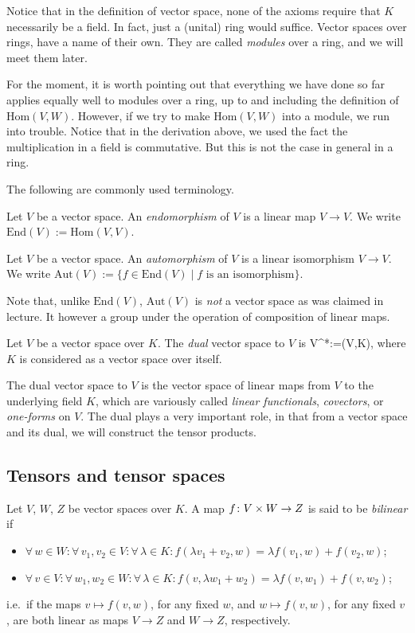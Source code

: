 \br
Notice that in the definition of vector space, none of the axioms require that $K$ necessarily be a field. In fact, just a (unital) ring would suffice. Vector spaces over rings, have a name of their own. They are called \emph{modules} over a ring, and we will meet them later.

For the moment, it is worth pointing out that everything we have done so far applies equally well to modules over a ring, up to and including the definition of $\mathrm{Hom}(V,W)$. However, if we try to make $\mathrm{Hom}(V,W)$ into a module, we run into trouble. Notice that in the derivation above, we used the fact the multiplication in a field is commutative. But this is not the case in general in a ring.
\er

The following are commonly used terminology.

\bd
Let $V$ be a vector space. An \emph{endomorphism} of $V$ is a linear map $V\to V$. We write $\mathrm{End}(V):=\mathrm{Hom}(V,V)$.
\ed

\bd
Let $V$ be a vector space. An \emph{automorphism} of $V$ is a linear isomorphism $V\to V$. We write $\mathrm{Aut}(V):=\{f \in \mathrm{End}(V) \mid f \text{ is an isomorphism}\}$.
\ed

\br
Note that, unlike $\mathrm{End}(V)$, $\mathrm{Aut}(V)$ is \emph{not} a vector space as was claimed in lecture. It however a group under the operation of composition of linear maps.
\er

\bd
Let $V$ be a vector space over $K$. The \emph{dual} vector space to $V$ is
\bse
V^*:=\Hom(V,K),
\ese
where $K$ is considered as a vector space over itself.
\ed

The dual vector space to $V$ is the vector space of linear maps from $V$ to the underlying field $K$, which are variously called \emph{linear functionals}, \emph{covectors}, or \emph{one-forms} on $V$. The dual plays a very important role, in that from a vector space and its dual, we will construct the tensor products.

\subsection{Tensors and tensor spaces}

\bd
Let $V$, $W$, $Z$ be vector spaces over $K$. A map $f\colon V\times W \to Z$ is said to be \emph{bilinear} if
\begin{itemize}
\item $\forall \, w\in W:\forall \, v_1,v_2\in V: \forall \,\lambda \in K : f(\lambda v_1+v_2,w)=\lambda f(v_1,w)+f(v_2,w)$;
\item $\forall \, v\in V:\forall \, w_1,w_2\in W: \forall \,\lambda \in K : f(v,\lambda w_1+w_2)=\lambda f(v,w_1)+f(v,w_2)$;
\end{itemize}
i.e.\ if the maps $v\mapsto f(v,w)$, for any fixed $w$, and $w\mapsto f(v,w)$, for any fixed $v$, are both linear as maps $V\to Z$ and $W\to Z$, respectively.
\ed

